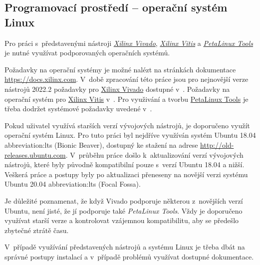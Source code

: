 \documentclass[a4paper, twoside, 11pt]{article}
\begin{document}
		\subsection{Programovací prostředí – operační systém Linux}
			Pro práci s~představenými nástroji \hyperref[subsec:xilinx-vivado]{\textit{Xilinx Vivado}}, \hyperref[subsec:xilinx-vitis]{\textit{Xilinx Vitis}} a \hyperref[subsec:petalinux-tools]{\textit{PetaLinux Tools}} je nutné využívat podporovaných operačních systémů.\par
			Požadavky na operační systémy je možné nalézt na stránkách dokumentace \href{https://docs.xilinx.com}{\textcolor{ctublue}{https://docs.xilinx.com}}. V~době zpracování této práce jsou pro nejnovější verze nástrojů 2022.2 požadavky pro \hyperref[subsec:xilinx-vivado]{Xilinx Vivado} dostupné v~\cite{xilinx-vivado-design-suite-user-guide-2022}. Požadavky na operační systém pro \hyperref[subsec:xilinx-vitis]{Xilinx Vitis} v~\cite{vitis-unified-software-platform-documentation-2022}. Pro využivání a tvorbu \hyperref[subsec:petalinux-tools]{PetaLinux Tools} je třeba dodržet systémové požadavky uvedené v~\cite{petalinux-tools-documentation-2022}.\par
			Pokud uživatel využívá starších verzí vývojových nástrojů, je doporučeno využít operační systém Linux. Pro tuto práci byl nejdříve využíván systém Ubuntu 18.04 \gls{abbreviation:lts} (Bionic Beaver), dostupný ke stažení na adrese \href{http://old-releases.ubuntu.com}{\textcolor{ctublue}{http://old-releases.ubuntu.com}}. V~průběhu práce došlo k~aktualizování verzí vývojových nástrojů, které byly původně kompatibilní pouze s~verzí Ubuntu 18.04 a nižší. Veškerá práce a postupy byly po aktualizaci přeneseny na novější verzi systému Ubuntu 20.04 \gls{abbreviation:lts} (Focal Fossa).\par
			Je důležité poznamenat, že když Vivado podporuje některou z~novějších verzí Ubuntu, není jisté, že jí podporuje také \textit{PetaLinux Tools}. Vždy je doporučeno využívat starší verze a kontrolovat vzájemnou kompatibilitu, aby se předešlo zbytečné ztrátě času.\par
			V~případě využívání představených nástrojů a systému Linux je třeba dbát na správné postupy instalací a v~případě problémů využívat dostupné dokumentace.
\end{document}
